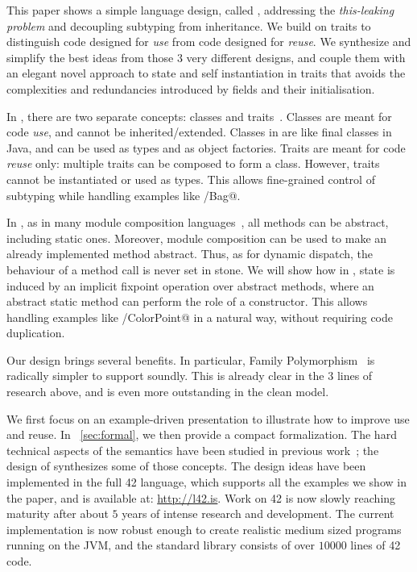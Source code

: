 This paper shows a simple language design, called \name,
addressing the \emph{this-leaking problem} and decoupling subtyping from inheritance.
We build on traits to distinguish code designed for
\emph{use} from code designed for \emph{reuse}.
We synthesize and simplify the best ideas from those $3$ very
different designs, and couple them with an elegant novel approach to
state and self instantiation in traits that avoids the complexities and redundancies introduced by fields and their initialisation.

In \name, there are two separate concepts: classes
and traits~\cite{ducasse2006traits}. Classes are meant for code \emph{use}, and cannot be inherited/extended. Classes in \name are like final classes in
Java, and can be used as types and as object factories. Traits are meant for code \emph{reuse} only: multiple traits can be
composed to form a class. However, traits 
cannot be instantiated or used as types.
This allows fine-grained control of subtyping while handling examples like \Q@Set/Bag@.

In \name, as in many module composition languages~\cite{ancona_zucca_2002},
all methods can be abstract, including static ones.
Moreover, module composition can be used to make
an already implemented method abstract.
Thus, as for dynamic dispatch, the behaviour of a method call is never set in stone.
We will show how in \name, state is induced by an implicit fixpoint operation over abstract methods,
where an abstract static method can perform the role of a constructor.
This allows handling examples like \Q@Point/ColorPoint@ in a natural way, without requiring code duplication.

Our design brings several benefits. In particular, 
Family Polymorphism~\cite{ernst2004expression} is
radically simpler to support soundly.
This is already clear in the $3$ lines of
research above, and is even more outstanding in the clean \name model.

We first focus on an example-driven presentation to illustrate how to
improve use and reuse. 
In ~\autoref{sec:formal}, 
we then provide a compact formalization.
The hard technical aspects of the
semantics have been studied in previous 
work~\cite{Bettini:2010:ISP:1774088.1774530,BETTINI2013521,Bettini2015282,KrogdahlMS09,DBLP:journals/taosd/AxelsenSKM12,DBLP:conf/gpce/AxelsenK12,deep,servetto2014meta,fjig};
the design of \name synthesizes some of those concepts.
The design ideas have been implemented in the full 42 language, which supports all
the examples we show in the paper, and is available at: \url{http://l42.is}.
Work on 42 is now slowly reaching maturity after about $5$ years of
intense research and development. The current implementation 
is now robust enough to create realistic medium sized programs running 
on the JVM, and the standard library consists of over $10000$ lines of
42 code. 

